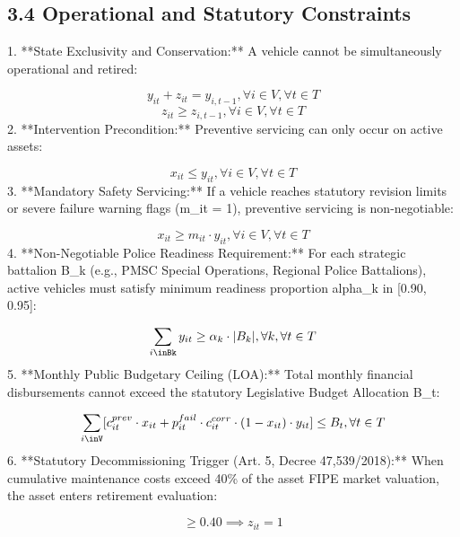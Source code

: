 \documentclass[10pt,a4paper,journal]{article}
\begin{document}
\subsection{3.4 Operational and Statutory Constraints}
1. **State Exclusivity and Conservation:** A vehicle cannot be simultaneously operational and retired:

\begin{equation}
y_{it} + z_{it} = y_{i,t-1}, \forall i \in V, \forall t \in T \label{eq:5}
\end{equation}
\begin{equation}
z_{it} \ge z_{i,t-1}, \forall i \in V, \forall t \in T \label{eq:6}
\end{equation}
2. **Intervention Precondition:** Preventive servicing can only occur on active assets:

\begin{equation}
x_{it} \le y_{it}, \forall i \in V, \forall t \in T \label{eq:7}
\end{equation}
3. **Mandatory Safety Servicing:** If a vehicle reaches statutory revision limits or severe failure warning flags (m\_it = 1), preventive servicing is non-negotiable:

\begin{equation}
x_{it} \ge m_{it} \cdot y_{it}, \forall i \in V, \forall t \in T \label{eq:8}
\end{equation}
4. **Non-Negotiable Police Readiness Requirement:** For each strategic battalion B\_k (e.g., PMSC Special Operations, Regional Police Battalions), active vehicles must satisfy minimum readiness proportion alpha\_k in [0.90, 0.95]:

\begin{equation}
\sum_{i\inBk} y_{it} \ge \alpha_{k} \cdot |B_{k}|, \forall k, \forall t \in T \label{eq:9}
\end{equation}
5. **Monthly Public Budgetary Ceiling (LOA):** Total monthly financial disbursements cannot exceed the statutory Legislative Budget Allocation B\_t:

\begin{equation}
\sum_{i\inV} [ c_{it}^{prev} \cdot x_{it} + p_{it}^{fail} \cdot c_{it}^{corr} \cdot (1 - x_{it}) \cdot y_{it} ] \le B_{t}, \forall t \in T \label{eq:10}
\end{equation}
6. **Statutory Decommissioning Trigger (Art. 5, Decree 47,539/2018):** When cumulative maintenance costs exceed 40\% of the asset FIPE market valuation, the asset enters retirement evaluation:

\begin{equation}
[ \sum_{\tau=1}^{t} c_{i\tau}^{actual} / Valuation_{i}^{FIPE} ] \ge 0.40 \implies z_{it} = 1 \label{eq:11}
\end{equation}
\end{document}

